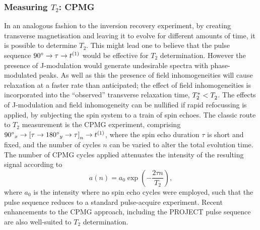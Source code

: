 \subsubsection{Measuring $T_2$: \acs{CPMG}}
\label{subsec:cpmg}
In an analogous fashion to the inversion recovery experiment, by creating
transverse magnetisation and leaving it to evolve for different amounts of
time, it is possible to determine $T_2$. This might lead one to believe
that the pulse sequence $\ang{90} \rightarrow \tau \rightarrow t^{(1)}$ would be
effective for  $T_2$ determination. However the presence of J-modulation would
generate undesirable spectra with phase-modulated peaks. As well as this the
presence of field inhomogeneities will cause relaxation at a faster rate than
anticipated; the effect of field inhomogeneities is incorporated into the
``observed'' transverse relaxation time, $T_2^* < T_2^{\vphantom{*}}$. The effects of
J-modulation and field inhomogeneity can be nullified if rapid refocussing is
applied, by subjecting the spin system to a train of spin echoes. The classic
route to $T_2$ measurement is the \ac{CPMG}
experiment\cite{Carr1954,Meiboom1958}, comprising $\ang{90}_x \rightarrow
\left[ \tau \rightarrow \ang{180}_y \rightarrow \tau \right]_n \rightarrow
t^{(1)}$, where the spin echo duration $\tau$ is short and fixed, and the number
of cycles $n$ can be varied to alter the total evolution time. The number of
\ac{CPMG} cycles applied attenuates the intensity of the resulting signal
according to
\begin{equation}
    a(n) = a_0 \exp\left(-\frac{2 \tau n}{T_2}\right),
\end{equation}
where $a_0$ is the intensity where no spin echo cycles were employed, such that
the pulse sequence reduces to a standard pulse-acquire experiment. Recent
enhancements to the \ac{CPMG} approach, including the \ac{PROJECT} pulse
sequence\cite{Aguilar2012} are also well-suited to $T_2$ determination.

